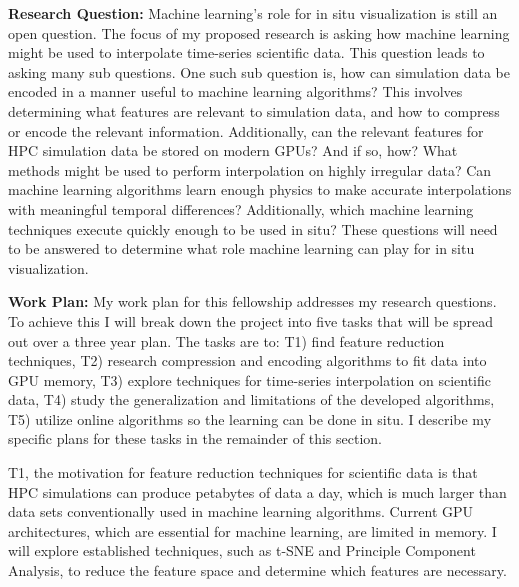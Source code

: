 \documentclass[12pt]{article}
\begin{document}
\textbf{Research Question:} Machine learning's role for in situ visualization is
still an open question.
%
The focus of my proposed research is asking how machine learning might be used
to interpolate time-series scientific data. This question leads to asking many
sub questions.  One such sub question is, how can simulation data be encoded in
a manner useful to machine learning algorithms?
%
This involves determining what features are relevant to simulation data, and how
to compress or encode the relevant information. Additionally, can the relevant
features for HPC simulation data be stored on modern GPUs? And if so, how?
%
What methods might be used to perform interpolation on highly irregular data?
Can machine learning algorithms learn enough physics to make accurate
interpolations with meaningful temporal differences? 
%
Additionally, which machine learning techniques execute quickly enough to be
used in situ? 
%
These questions will need to be answered to determine what role machine
learning can play for in situ visualization.


\textbf{Work Plan:}
My work plan for this fellowship addresses my research questions.
To achieve this I will
break down the project into five tasks that will be spread out over a three
year plan. The tasks are to: T1) find feature reduction techniques, T2) research
compression and encoding algorithms to fit data into GPU memory, T3) explore
techniques for time-series interpolation on scientific data, T4) study the
generalization and limitations of the developed algorithms, T5) utilize online
algorithms so the learning can be done in situ. I describe my specific plans for
these tasks in the remainder of this section.


T1, the motivation for feature reduction techniques for
scientific data is that HPC simulations can produce petabytes of data a
day, which is much larger than data sets conventionally used in machine learning
algorithms. Current GPU architectures, which are essential for machine learning,
are limited in memory. I will explore established techniques, such as
t-SNE and Principle Component Analysis, to reduce the feature space and
determine which features are necessary.
\end{document}
